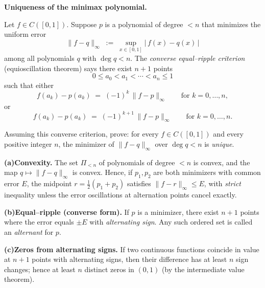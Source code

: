 \begin{problem}[CP-II-0346]
\label{prob:cp-ii-0346}
\textbf{Uniqueness of the minimax polynomial.}

\hspace*{1.5em}Let $f\in C([0,1])$. Suppose $p$ is a polynomial of degree $<n$ that minimizes the uniform error
\[
\|f-q\|_\infty \;:=\; \sup_{x\in[0,1]} |\,f(x)-q(x)\,|
\]
among all polynomials $q$ with $\deg q<n$.
The \emph{converse equal--ripple criterion} (equioscillation theorem) says there exist $n+1$ points
\[
0\le a_0 < a_1 < \cdots < a_n \le 1
\]
such that either
\[
f(a_k)-p(a_k) \;=\; (-1)^k\,\|f-p\|_\infty \qquad \text{for } k=0,\dots,n,
\]
or
\[
f(a_k)-p(a_k) \;=\; (-1)^{k+1}\,\|f-p\|_\infty \qquad \text{for } k=0,\dots,n.
\]

\smallskip
\noindent
 Assuming this converse criterion, prove: for every $f\in C([0,1])$ and every positive integer $n$,
the minimizer of $\|f-q\|_\infty$ over $\deg q<n$ is \emph{unique}.

 \setlength{\itemsep}{0.6em}
	\par\smallskip\noindent\textbf{(a)}\quad \textbf{Convexity.}
	The set $\Pi_{<n}$ of polynomials of degree $<n$ is convex, and the map
	$q\mapsto \|f-q\|_\infty$ is convex.
	Hence, if $p_1,p_2$ are both minimizers with common error $E$, the midpoint
	$r=\tfrac12(p_1+p_2)$ satisfies $\|f-r\|_\infty\le E$,
	with \emph{strict} inequality unless the error oscillations at alternation points
	cancel exactly.

	\par\smallskip\noindent\textbf{(b)}\quad \textbf{Equal--ripple (converse form).}
	If $p$ is a minimizer, there exist $n+1$ points where the error equals $\pm E$
	with \emph{alternating sign}. Any such ordered set is called an \emph{alternant} for $p$.

	\par\smallskip\noindent\textbf{(c)}\quad \textbf{Zeros from alternating signs.}
	If two continuous functions coincide in value at $n+1$ points with alternating signs,
	then their difference has at least $n$ sign changes; hence at least $n$ distinct zeros
	in $(0,1)$ (by the intermediate value theorem).

\smallskip
\end{problem}

